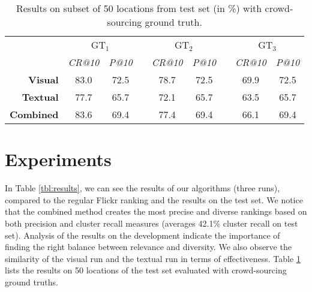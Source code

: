 \documentclass{acm_proc_article-me11_tweaked}
\begin{document}
\setlength{\textfloatsep}{0.5cm}
\begin{table}[H]
\centering
\caption{Results on subset of 50 locations from test set (in \%) with crowd-sourcing ground truth.}
\setlength{\tabcolsep}{.25667em}
 \begin{tabular}{|r|c|ccc|ccc|c|}
\cline{2-9}
   \multicolumn{1}{c|}{ } & \multicolumn{2}{c}{ GT$_1$}  & \vrule height2.75ex depth1.25ex width 1pt & \multicolumn{2}{c}{ GT$_2$} & \vrule height2.75ex depth1.25ex width 1pt & \multicolumn{2}{c|}{ GT$_3$}  \\\cline{2-9}
   \multicolumn{1}{c|}{ } &  \textit{CR@10} &   \textit{P@10} & \vrule height2.75ex depth1.25ex width 1pt &  \textit{CR@10} &  \textit{P@10} & \vrule height2.75ex depth1.25ex width 1pt &  \textit{CR@10} &   \textit{P@10}\\
   \hline
   \bfseries Visual   & 83.0 &72.5 & \vrule height2.75ex depth1.25ex width 1pt & 78.7  & 72.5  & \vrule height2.75ex depth1.25ex width 1pt & 69.9 & 72.5  \\\hline
  \bfseries Textual & 77.7  &65.7 & \vrule height2.75ex depth1.25ex width 1pt & 72.1 & 65.7& \vrule height2.75ex depth1.25ex width 1pt & 63.5  & 65.7 \\\hline
  \bfseries Combined &  83.6 & 69.4 & \vrule height2.75ex depth1.25ex width 1pt & 77.4  & 69.4& \vrule height2.75ex depth1.25ex width 1pt  &  66.1 &  69.4  \\
    \hline
    \end{tabular}
  \label{tbl:crowd-results}
\end{table}

\section{Experiments}
In Table \ref{tbl:results}, we can see the results of our algorithms (three runs), compared to the regular Flickr ranking and the results on the test set.
We notice that the combined method creates the most precise and diverse rankings based on both precision and cluster recall measures (averages 42.1\% cluster recall on test set).
Analysis of the results on the development indicate the importance of finding the right balance between relevance and diversity.
We also observe the similarity of the visual run and the textual run in terms of effectiveness.
Table \ref{tbl:crowd-results} lists the results on 50 locations of the test set evaluated with crowd-sourcing ground truths.
\end{document}
